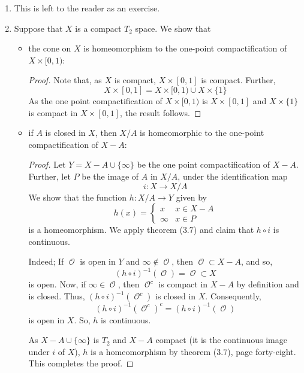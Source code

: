 \documentclass{book}
\DeclareMathOperator*{\Ocal}{\mathcal{O}}
\begin{document}
\begin{enumerate}[(1)]
    \item This is left to the reader as an exercise.

    \item Suppose that $X$ is a compact $T_2$ space. We show that 
        \begin{itemize}
            \item the cone on $X$ is homeomorphism to the one-point compactification of $X \times [0,1)$: 
                \begin{proof} Note that, as $X$ is compact, $X \times [0,1]$ is compact. Further, 
                    \[X \times [0,1] = X \times [0,1) \cup X \times \{1\}\] 
                    As the one point compactification of $X \times [0,1)$ is $X \times [0,1]$ and $X \times \{1\}$ is compact in $X \times [0,1]$, the result follows. 
                \end{proof}

            \item if $A$ is closed in $X$, then $X/A$ is homeomorphic to the one-point compactification of $X - A$: 
                \begin{proof} Let $Y = X - A \cup \{\infty\}$ be the one point compactification of $X - A$. Further, let $P$ be the image of $A$ in $X/A$, under the identification map 
                    \[i : X \rightarrow X/A \]
                    We show that the function $h: X/A \rightarrow Y$ given by 
                    \[h(x) = 
                    \begin{cases}
                        x & x \in X - A \\
                        \infty & x \in P 
                    \end{cases}
                    \]
                    is a homeomorphism. We apply theorem ($3.7$) and claim that $h \circ i$ is continuous. 
                    \par Indeed; If $\Ocal$ is open in $Y$ and $\infty \notin \Ocal$, then $\Ocal \subset X - A$, and so, 
                    \[(h \circ i)^{-1}(\Ocal) = \Ocal \subset X\]
                    is open. Now, if $\infty \in \Ocal$, then $\Ocal^c$ is compact in $X - A$ by definition and is closed. Thus, $(h \circ i)^{-1}(\Ocal^c)$ is closed in $X$. Consequently, 
                    \[(h \circ i)^{-1}(\Ocal^c)^c = (h \circ i)^{-1}(\Ocal) \]
                    is open in $X$. So, $h$ is continuous.  
                    \par As $X - A \cup \{\infty\}$ is $T_2$ and $X - A$ compact (it is the continuous image under $i$ of $X$), $h$ is a homeomorphism by theorem ($3.7$), page forty-eight. This completes the proof. 
                \end{proof}
        \end{itemize}


\end{enumerate}
\end{document}
